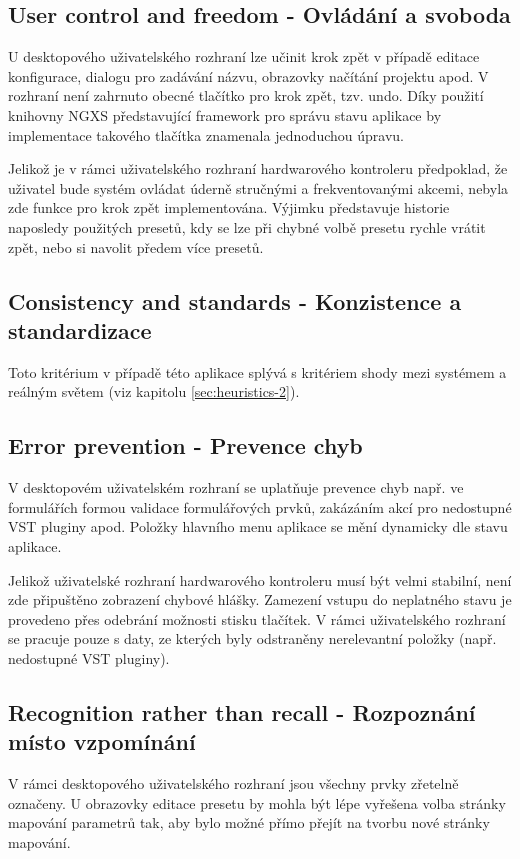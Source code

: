 \documentclass[thesis=M,czech]{FITthesis}[2019/03/06]
\begin{document}
		\subsection{User control and freedom - Ovládání a svoboda}
			U desktopového uživatelského rozhraní lze učinit krok zpět v případě editace konfigurace, dialogu pro zadávání názvu, obrazovky načítání projektu apod. V rozhraní není zahrnuto obecné tlačítko pro krok zpět, tzv. undo. Díky použití knihovny NGXS představující framework pro správu stavu aplikace by implementace takového tlačítka znamenala jednoduchou úpravu.
			
			Jelikož je v rámci uživatelského rozhraní hardwarového kontroleru předpoklad, že uživatel bude systém ovládat úderně stručnými a frekventovanými akcemi, nebyla zde funkce pro krok zpět implementována. Výjimku představuje historie naposledy použitých presetů, kdy se lze při chybné volbě presetu rychle vrátit zpět, nebo si navolit předem více presetů.
			
		\subsection{Consistency and standards - Konzistence a standardizace}
			Toto kritérium v případě této aplikace splývá s kritériem shody mezi systémem a reálným světem (viz kapitolu \ref{sec:heuristics-2}).
		
		\subsection{Error prevention - Prevence chyb}
			V desktopovém uživatelském rozhraní se uplatňuje prevence chyb např. ve formulářích formou validace formulářových prvků, zakázáním akcí pro nedostupné VST pluginy apod. Položky hlavního menu aplikace se mění dynamicky dle stavu aplikace.
			
			Jelikož uživatelské rozhraní hardwarového kontroleru musí být velmi stabilní, není zde připuštěno zobrazení chybové hlášky. Zamezení vstupu do neplatného stavu je provedeno přes odebrání možnosti stisku tlačítek.
			V rámci uživatelského rozhraní se pracuje pouze s daty, ze kterých byly odstraněny nerelevantní položky
			(např. nedostupné VST pluginy).
					
		\subsection{Recognition rather than recall - Rozpoznání místo vzpomínání}
			V rámci desktopového uživatelského rozhraní jsou všechny prvky zřetelně označeny. U obrazovky editace presetu by mohla být lépe vyřešena volba stránky mapování parametrů tak, aby bylo možné přímo přejít na tvorbu nové stránky mapování.
			
\end{document}
